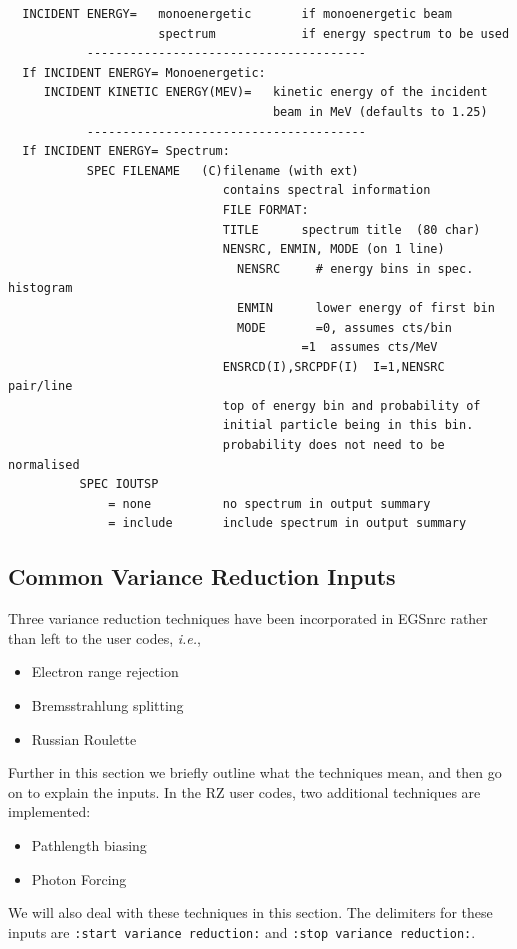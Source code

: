 \documentclass[12pt,twoside]{article}  %
\begin{document}
\begin{verbatim}
  INCIDENT ENERGY=   monoenergetic       if monoenergetic beam
                     spectrum            if energy spectrum to be used
           ---------------------------------------
  If INCIDENT ENERGY= Monoenergetic:
     INCIDENT KINETIC ENERGY(MEV)=   kinetic energy of the incident 
                                     beam in MeV (defaults to 1.25)
           ---------------------------------------
  If INCIDENT ENERGY= Spectrum:
           SPEC FILENAME   (C)filename (with ext)
                              contains spectral information
                              FILE FORMAT:
                              TITLE      spectrum title  (80 char)
                              NENSRC, ENMIN, MODE (on 1 line)
                                NENSRC     # energy bins in spec. histogram
                                ENMIN      lower energy of first bin
                                MODE       =0, assumes cts/bin
                                         =1  assumes cts/MeV
                              ENSRCD(I),SRCPDF(I)  I=1,NENSRC pair/line
                              top of energy bin and probability of
                              initial particle being in this bin.
                              probability does not need to be normalised
          SPEC IOUTSP
              = none          no spectrum in output summary
              = include       include spectrum in output summary
\end{verbatim}

\subsection{Common Variance Reduction Inputs}
\label{varredsect}

Three variance reduction techniques have been incorporated in 
EGSnrc rather than left to the user codes, {\em i.e.},
\begin{itemize}
\item{Electron range rejection}
\item{Bremsstrahlung splitting}
\item{Russian Roulette}
\end{itemize}
Further in this section we briefly outline what the techniques mean, and
then go on to explain the inputs.
In the RZ user codes, two additional techniques are implemented:
\begin{itemize}
\item{Pathlength biasing}
\item{Photon Forcing}
\end{itemize}
We will also deal with these techniques in this section.
The delimiters for these inputs are 
\verb+:start variance reduction:+  and \verb+:stop variance reduction:+.
\end{document}
